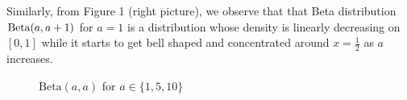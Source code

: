 \documentclass[12pt, fullpage,letterpaper]{article}
\begin{document}
\begin{enumerate}
{Similarly, from Figure 1 (right picture), we observe that that Beta distribution ${\rm Beta}(a,a+1)$ for $a=1$ is a distribution whose density is linearly 
decreasing on $[0,1]$ while it starts to get bell shaped and concentrated around $x=\frac12$ as $a$ increases.	
\begin{figure}[H]
\begin{center}
\begin{minipage}{0.4\textwidth}
     \caption{{\footnotesize $\text{Beta}(a,a)$ for  $a\in\{1,5,10\}$}}\label{Fig.2}      
     \end{minipage}
     \begin{minipage}{0.4\textwidth}

\end{minipage}
\end{center}
\end{figure}}
\end{enumerate}
\end{document}
